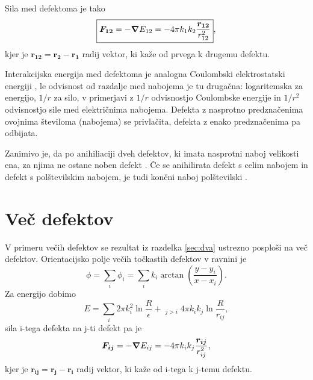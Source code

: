 \documentclass[11pt]{article}
\begin{document}
\noindent
Sila med defektoma je tako
\begin{equation*}
    \boxed{\bm{F_{12}} = -\grad E_{12} = -4\pi k_{1}k_{2}\frac{\bm{r_{12}}}{r_{12}^{2}}},
\end{equation*}
kjer je $\bm{r_{12}} = \bm{r_{2}}-\bm{r_{1}}$ radij vektor, ki kaže od prvega k drugemu defektu.


Interakcijska energija med defektoma je analogna Coulombski elektrostatski energiji \cite{vromans2016orientational}, le odvisnost od razdalje med nabojema je tu drugačna: logaritemska za energijo, $1/r$ za silo, v primerjavi z $1/r$ odvisnostjo Coulombske energije in $1/r^{2}$ odvisnostjo sile med električnima nabojema. Defekta z nasprotno predznačenima ovojnima številoma (nabojema) se privlačita, defekta z enako predznačenima pa odbijata. 

Zanimivo je, da po anihiliaciji dveh defektov, ki imata nasprotni naboj velikosti ena, za njima ne ostane noben defekt \cite{liang2021phase}.
 Če se anihilirata defekt s celim nabojem in defekt s polštevilskim nabojem, je tudi končni naboj polštevilski \cite{liang2021phase}.



\section{Več defektov}

V primeru večih defektov se rezultat iz razdelka \ref{sec:dva} ustrezno posploši na več defektov.
\noindent Orientacijsko polje večih točkastih defektov v ravnini je
\begin{equation*}
    \phi=\sum_{i} \phi_{i} = \sum_{i} k_i \arctan\left(\frac{y-y_{i}}{x-x_{i}}\right).
\end{equation*}
Za energijo dobimo
\begin{equation*}
    E = \sum_{i}2\pi k_{i}^{2} \ln{\frac{R}{\epsilon}} + \mathop{\sum_{i,j}}_{j>i}4\pi k_{i}k_{j} \ln{\frac{R}{r_{ij}}},
\end{equation*}
sila i-tega defekta na j-ti defekt pa je
\begin{equation*}
    \bm{F_{ij}} = -\grad E_{ij} = -4\pi k_{i}k_{j}\frac{\bm{r_{ij}}}{r_{ij}^{2}},
\end{equation*}
kjer je $\bm{r_{ij}} = \bm{r_{j}}-\bm{r_{i}}$ radij vektor, ki kaže od i-tega k j-temu defektu.
\end{document}
